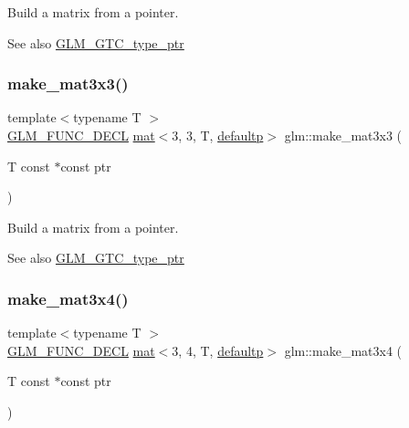 Build a matrix from a pointer. \begin{DoxySeeAlso}{See also}
\hyperlink{group__gtc__type__ptr}{G\+L\+M\+\_\+\+G\+T\+C\+\_\+type\+\_\+ptr} 
\end{DoxySeeAlso}
\mbox{\label{group__gtc__type__ptr_gaf2e8337b15c3362aaeb6e5849e1c0536}} 
\subsubsection{\texorpdfstring{make\+\_\+mat3x3()}{make\_mat3x3()}}
{\footnotesize\ttfamily template$<$typename T $>$ \\
\hyperlink{setup_8hpp_ab2d052de21a70539923e9bcbf6e83a51}{G\+L\+M\+\_\+\+F\+U\+N\+C\+\_\+\+D\+E\+CL} \hyperlink{structglm_1_1mat}{mat}$<$3, 3, T, \hyperlink{namespaceglm_a36ed105b07c7746804d7fdc7cc90ff25a9d21ccd8b5a009ec7eb7677befc3bf51}{defaultp}$>$ glm\+::make\+\_\+mat3x3 (\begin{DoxyParamCaption}\item[{T const $\ast$const}]{ptr }\end{DoxyParamCaption})}

Build a matrix from a pointer. \begin{DoxySeeAlso}{See also}
\hyperlink{group__gtc__type__ptr}{G\+L\+M\+\_\+\+G\+T\+C\+\_\+type\+\_\+ptr} 
\end{DoxySeeAlso}
\mbox{\label{group__gtc__type__ptr_ga05dd66232aedb993e3b8e7b35eaf932b}} 
\subsubsection{\texorpdfstring{make\+\_\+mat3x4()}{make\_mat3x4()}}
{\footnotesize\ttfamily template$<$typename T $>$ \\
\hyperlink{setup_8hpp_ab2d052de21a70539923e9bcbf6e83a51}{G\+L\+M\+\_\+\+F\+U\+N\+C\+\_\+\+D\+E\+CL} \hyperlink{structglm_1_1mat}{mat}$<$3, 4, T, \hyperlink{namespaceglm_a36ed105b07c7746804d7fdc7cc90ff25a9d21ccd8b5a009ec7eb7677befc3bf51}{defaultp}$>$ glm\+::make\+\_\+mat3x4 (\begin{DoxyParamCaption}\item[{T const $\ast$const}]{ptr }\end{DoxyParamCaption})}

